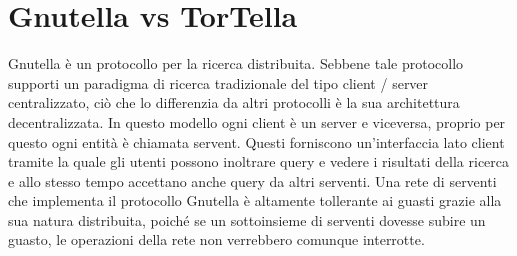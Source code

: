 \chapter{Gnutella vs TorTella}
Gnutella è un protocollo per la ricerca distribuita. Sebbene tale protocollo  supporti un paradigma di ricerca tradizionale del tipo client / server centralizzato, ciò che lo differenzia da altri protocolli è la sua architettura decentralizzata. In questo modello ogni client è un server e viceversa, proprio per questo ogni entità è chiamata servent. Questi forniscono un’interfaccia lato client tramite la quale gli utenti possono inoltrare query e vedere i risultati della ricerca e allo stesso tempo accettano anche query da altri serventi. Una rete di serventi che implementa il protocollo Gnutella è altamente tollerante ai guasti grazie alla sua natura distribuita, poiché se un sottoinsieme di serventi dovesse subire un guasto, le operazioni della rete non verrebbero comunque interrotte.
